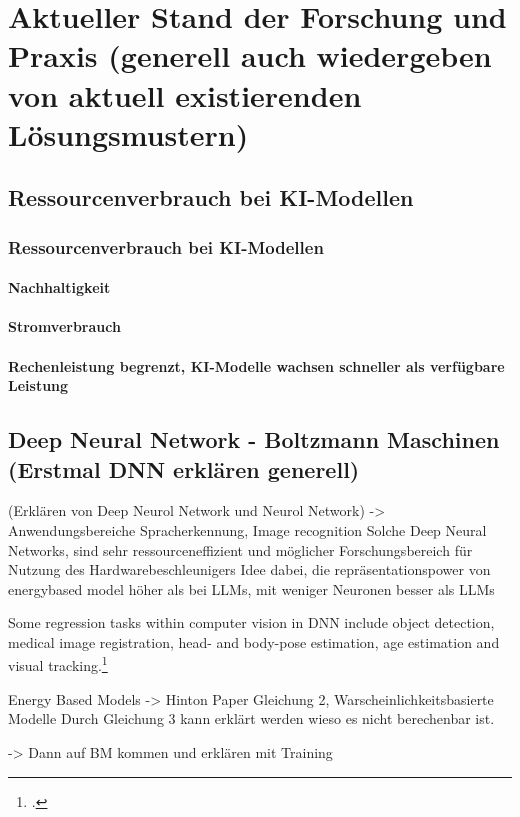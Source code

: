 \chapter{Aktueller Stand der Forschung und Praxis (generell auch wiedergeben von aktuell existierenden Lösungsmustern)}

\section{Ressourcenverbrauch bei KI-Modellen}
\subsection{Ressourcenverbrauch bei KI-Modellen}
\subsubsection{Nachhaltigkeit}
\subsubsection{Stromverbrauch}
\subsubsection{Rechenleistung begrenzt, KI-Modelle wachsen schneller als verfügbare Leistung}

\section{Deep Neural Network - Boltzmann Maschinen (Erstmal DNN erklären generell)}

(Erklären von Deep Neurol Network und Neurol Network) -> Anwendungsbereiche Spracherkennung, Image recognition
Solche Deep Neural Networks, sind sehr ressourceneffizient und möglicher Forschungsbereich für Nutzung des Hardwarebeschleunigers
Idee dabei, die repräsentationspower von energybased model höher als bei LLMs, mit weniger Neuronen besser als LLMs 


Some regression tasks within computer vision in \ac{DNN} include object detection, medical image registration, head- and body-pose estimation, age estimation and visual tracking.\footcite[Vgl.][325-326]{gustafssonEnergyBasedModelsDeep2020}


Energy Based Models -> Hinton Paper Gleichung 2, Warscheinlichkeitsbasierte Modelle
Durch Gleichung 3 kann erklärt werden wieso es nicht berechenbar ist. 

-> Dann auf BM kommen und erklären mit Training 

